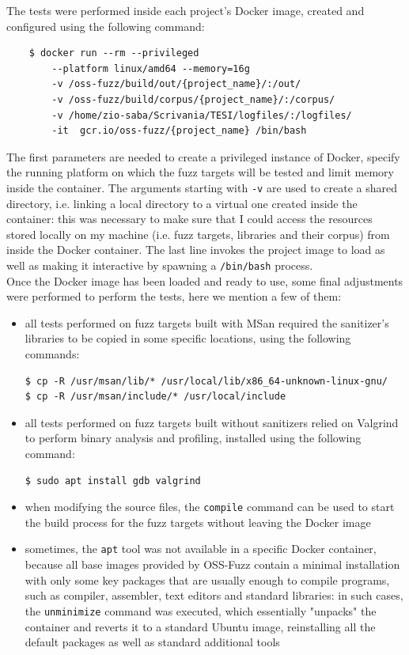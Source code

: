 The tests were performed inside each project's Docker image, created and configured using the following command:
\begin{verbatim}
    $ docker run --rm --privileged 
        --platform linux/amd64 --memory=16g 
        -v /oss-fuzz/build/out/{project_name}/:/out/
        -v /oss-fuzz/build/corpus/{project_name}/:/corpus/    
        -v /home/zio-saba/Scrivania/TESI/logfiles/:/logfiles/ 
        -it  gcr.io/oss-fuzz/{project_name} /bin/bash
\end{verbatim}
The first parameters are needed to create a privileged instance of Docker, specify the running platform on which the fuzz targets will be tested and limit memory inside the container. The arguments starting with \verb|-v| are used to create a shared directory, i.e. linking a local directory to a virtual one created inside the container: this was necessary to make sure that I could access the resources stored locally on my machine (i.e. fuzz targets, libraries and their corpus) from inside the Docker container. The last line invokes the project image to load as well as making it interactive by spawning a \verb|/bin/bash| process.
\ \\

Once the Docker image has been loaded and ready to use, some final adjustments were performed to perform the tests, here we mention a few of them:
\begin{itemize}
    \item all tests performed on fuzz targets built with MSan required the sanitizer's libraries to be copied in some specific locations, using the following commands:
\begin{verbatim}
$ cp -R /usr/msan/lib/* /usr/local/lib/x86_64-unknown-linux-gnu/
$ cp -R /usr/msan/include/* /usr/local/include
\end{verbatim}
    \item all tests performed on fuzz targets built without sanitizers relied on Valgrind to perform binary analysis and profiling, installed using the following command:
\begin{verbatim}
$ sudo apt install gdb valgrind
\end{verbatim} 
    \item when modifying the source files, the \verb|compile| command can be used to start the build process for the fuzz targets without leaving the Docker image
    \item sometimes, the \verb|apt| tool was not available in a specific Docker container, because all base images provided by OSS-Fuzz contain a minimal installation with only some key packages that are usually enough to compile programs, such as compiler, assembler, text editors and standard libraries: in such cases, the \verb|unminimize| command was executed, which essentially "unpacks" the container and reverts it to a standard Ubuntu image, reinstalling all the default packages as well as standard additional tools
\end{itemize}


